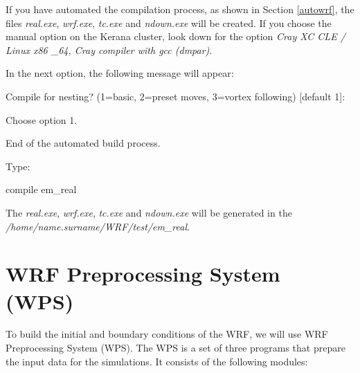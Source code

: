  If you have automated the compilation process, as shown in Section \textcolor{bleu_cite}{\ref{autowrf}}, the files \textit{real.exe}, \textit {wrf.exe},
\textit{tc.exe} and \textit{ndown.exe} will be created. If you choose the manual option on the Kerana cluster, look down for the option \textit{Cray XC CLE / Linux x86 \_64, Cray compiler with gcc (dmpar)}.
\bigskip

 In the next option, the following message will appear:
\bigskip

\begin{bashcode}
Compile for nesting? (1=basic, 2=preset moves, 3=vortex following) [default 1]:
\end{bashcode}
\bigskip

 Choose option 1.
\bigskip

\begin{tcolorbox}[enhanced,
  grow to left by=0cm,%
  grow to right by=0cm,%
  enlarge top by=0cm,%
  enlarge bottom by=0cm,%
  tcbox raise base,
  boxrule=1.0pt,
  left=18mm,
  colframe=red!50!black,coltext=red!25!black,colback=red!10!white,
  overlay={\begin{tcbclipinterior}\fill[red!75!blue!50!white] (frame.south west)
    rectangle node[text=white,font=\sffamily\bfseries\footnotesize,rotate=0] {WARNING} ([xshift=18mm]frame.north west);\end{tcbclipinterior}}]
End of the automated build process.
\end{tcolorbox}
\bigskip

 Type:
\bigskip

\begin{bashcode}
compile em_real
\end{bashcode}
\bigskip

 The \textit{real.exe}, \textit{wrf.exe}, \textit{tc.exe} and \textit{ndown.exe} will be generated in the \textit{/home/name.surname/WRF/test/em\_real}.
\bigskip

\section{WRF Preprocessing System (WPS)}\label{wpssecao}
\bigskip

 To build the initial and boundary conditions of the WRF, we will use WRF Preprocessing System (WPS). The WPS is a set of three programs that 
prepare the input data for the simulations. It consists of the following modules:
\bigskip

